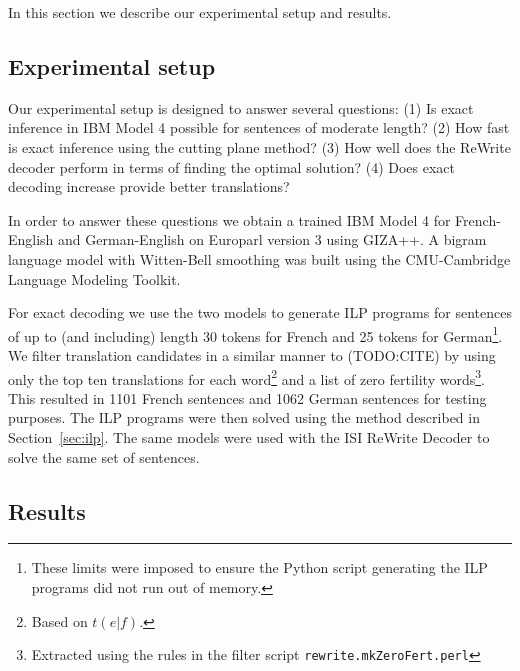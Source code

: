 In this section we describe our experimental setup and results.

\subsection{Experimental setup}
\label{sec:experimental-setup}

Our experimental setup is designed to answer several questions: (1) Is
exact inference in IBM Model 4 possible for sentences of moderate
length? (2) How fast is exact inference using the cutting plane
method? (3) How well does the ReWrite decoder perform in terms of
finding the optimal solution? (4) Does exact decoding increase provide
better translations?

In order to answer these questions we obtain a trained IBM Model 4 for
French-English and German-English on Europarl version 3 using GIZA++.
A bigram language model with Witten-Bell smoothing was built using the
CMU-Cambridge Language Modeling Toolkit.

For exact decoding we use the two models to generate ILP programs for
sentences of up to (and including) length 30 tokens for French and 25
tokens for German\footnote{These limits were imposed to ensure the
  Python script generating the ILP programs did not run out of
  memory.}.  We filter translation candidates in a similar manner to
(TODO:CITE) by using only the top ten translations for each
word\footnote{Based on $t(e|f)$.} and a list of zero fertility
words\footnote{Extracted using the rules in the filter script
  \texttt{rewrite.mkZeroFert.perl}}.  This resulted in 1101 French
sentences and 1062 German sentences for testing purposes.  The ILP
programs were then solved using the method described in
Section~\ref{sec:ilp}.  The same models were used with the ISI ReWrite
Decoder to solve the same set of sentences.


\subsection{Results}
\label{sec:results-results}

